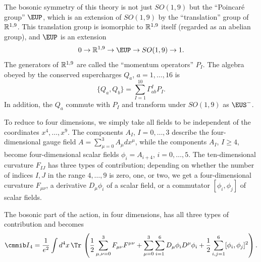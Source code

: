 The bosonic symmetry of this theory is not just $SO(1,9)$ but the
``Poincar\'e group'' $\EUP$, which is an extension of $SO(1,9)$ by
the ``translation'' group of $\Bbb{R}^{1,9}$.  This translation
group is isomorphic to $\Bbb{R}^{1,9}$ itself (regarded as an
abelian group), and ${\EUP}$ is an extension %
\setcounter{equation}{7}
\begin{equation}\label{eq:ugy}
0\to
\Bbb{R}^{1,9}\to \EUP\to SO(1,9)\to 1.
\end{equation}
  The generators of
$\Bbb{R}^{1,9}$ are called the ``momentum operators'' $P_I$.  The
algebra obeyed by the conserved supercharges $Q_a$, $a=1,\dots,16$
is %
\setcounter{equation}{8}
\begin{equation}\label{eq:realify}
\{Q_a,Q_b\}=\sum_{I=1}^{10}\Gamma^I_{ab}P_I.
\end{equation}
 In
addition, the $Q_a$ commute with $P_I$ and transform under
$SO(1,9)$ as ${\EUS}^-$.

\par{}

To reduce to four dimensions, we simply take all fields to be
independent of the coordinates $x^4,\dots,x^9$.  The components
$A_I$, $I=0,\dots,3$ describe the four-dimensional gauge field
$A=\sum_{\mu=0}^3A_\mu dx^\mu$, while the components $A_I$, $I\geq
4$, become four-dimensional scalar fields $\phi_i=A_{i+4}$,
$i=0,\dots,5$. The ten-dimensional curvature $F_{IJ}$ has three
types of contribution; depending on whether the number of indices
$I,J$ in the range $4,\dots, 9$ is zero, one, or two, we get a
four-dimensional curvature $F_{\mu\nu}$, a derivative
$D_\mu\phi_i$ of a scalar field, or a commutator $[\phi_i,\phi_j]$
of scalar fields.

The bosonic part of the action, in four dimensions, has all three
types of contribution and becomes %
\setcounter{equation}{9}
\begin{equation}\label{eq:loopy}
{{\cmmib
I}}_4={1\over e^2}\int d^4x\,\Tr\,\left({1\over
2}\sum_{\mu,\nu=0}^3F_{\mu\nu}F^{\mu\nu}+\sum_{\mu=0}^3\sum_{i=1}^6D_\mu\phi_i
D^\mu\phi_i +{1\over 2}\sum_{i,j=1}^6[\phi_i,\phi_j]^2\right).
\end{equation}

